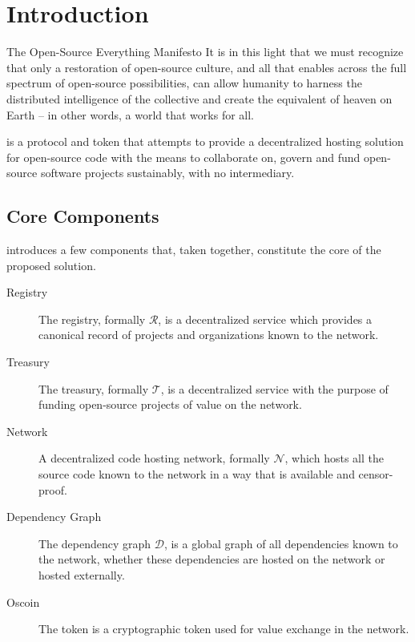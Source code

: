 \section{Introduction}

\begin{epigraph}{The Open-Source Everything Manifesto}
    \noindent It is in this light that we must recognize that only a restoration of
    open-source culture, and all that enables across the full spectrum of
    open-source possibilities, can allow humanity to harness the distributed
    intelligence of the collective and create the equivalent of heaven on Earth
    -- in other words, a world that works for all.
\end{epigraph}
\medskip

\noindent \oscoin{} is a protocol and token that attempts to provide a decentralized
hosting solution for open-source code with the means to collaborate on, govern
and fund open-source software projects sustainably, with no intermediary.

\subsection{Core Components}

\oscoin{} introduces a few components that, taken together, constitute the core
of the proposed solution.

\begin{description}
    \item[Registry] The registry, formally $\mathcal{R}$, is a
        decentralized service which provides a canonical record of projects and
        organizations known to the network.
    \item[Treasury] The treasury, formally $\mathcal{T}$, is a
        decentralized service with the purpose of funding open-source projects
        of value on the network.
    \item[Network] A decentralized code hosting network, formally
        $\mathcal{N}$, which hosts all the source code known to the network
        in a way that is available and censor-proof.
    \item[Dependency Graph] The dependency graph $\mathcal{D}$, is a global
        graph of all dependencies known to the network, whether these
        dependencies are hosted on the network or hosted externally.
    \item[Oscoin] The \oscoin{} token is a cryptographic token used for value
        exchange in the network.
\end{description}


